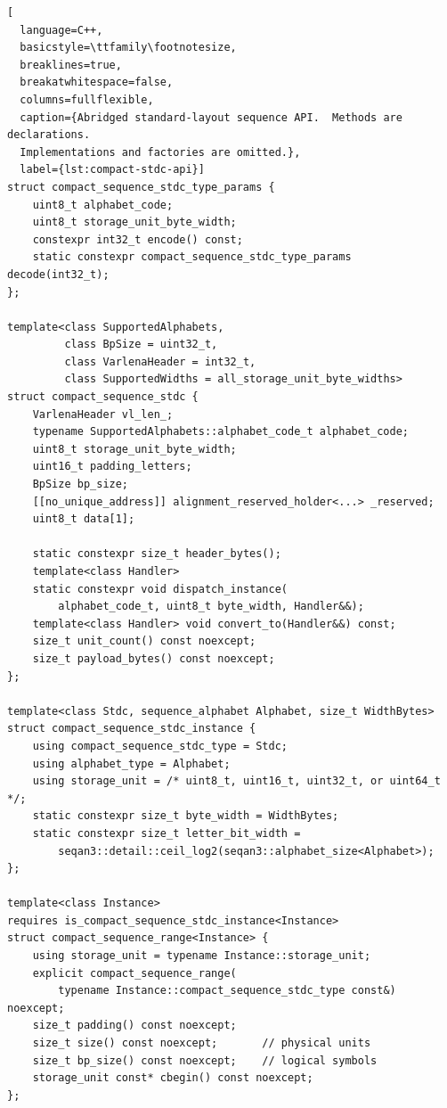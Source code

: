 \begin{lstlisting}[
  language=C++,
  basicstyle=\ttfamily\footnotesize,
  breaklines=true,
  breakatwhitespace=false,
  columns=fullflexible,
  caption={Abridged standard-layout sequence API.  Methods are declarations.
  Implementations and factories are omitted.},
  label={lst:compact-stdc-api}]
struct compact_sequence_stdc_type_params {
    uint8_t alphabet_code;
    uint8_t storage_unit_byte_width;
    constexpr int32_t encode() const;
    static constexpr compact_sequence_stdc_type_params decode(int32_t);
};

template<class SupportedAlphabets,
         class BpSize = uint32_t,
         class VarlenaHeader = int32_t,
         class SupportedWidths = all_storage_unit_byte_widths>
struct compact_sequence_stdc {
    VarlenaHeader vl_len_;
    typename SupportedAlphabets::alphabet_code_t alphabet_code;
    uint8_t storage_unit_byte_width;
    uint16_t padding_letters;
    BpSize bp_size;
    [[no_unique_address]] alignment_reserved_holder<...> _reserved;
    uint8_t data[1];

    static constexpr size_t header_bytes();
    template<class Handler>
    static constexpr void dispatch_instance(
        alphabet_code_t, uint8_t byte_width, Handler&&);
    template<class Handler> void convert_to(Handler&&) const;
    size_t unit_count() const noexcept;
    size_t payload_bytes() const noexcept;
};

template<class Stdc, sequence_alphabet Alphabet, size_t WidthBytes>
struct compact_sequence_stdc_instance {
    using compact_sequence_stdc_type = Stdc;
    using alphabet_type = Alphabet;
    using storage_unit = /* uint8_t, uint16_t, uint32_t, or uint64_t */;
    static constexpr size_t byte_width = WidthBytes;
    static constexpr size_t letter_bit_width =
        seqan3::detail::ceil_log2(seqan3::alphabet_size<Alphabet>);
};

template<class Instance>
requires is_compact_sequence_stdc_instance<Instance>
struct compact_sequence_range<Instance> {
    using storage_unit = typename Instance::storage_unit;
    explicit compact_sequence_range(
        typename Instance::compact_sequence_stdc_type const&) noexcept;
    size_t padding() const noexcept;
    size_t size() const noexcept;       // physical units
    size_t bp_size() const noexcept;    // logical symbols
    storage_unit const* cbegin() const noexcept;
};
\end{lstlisting}

